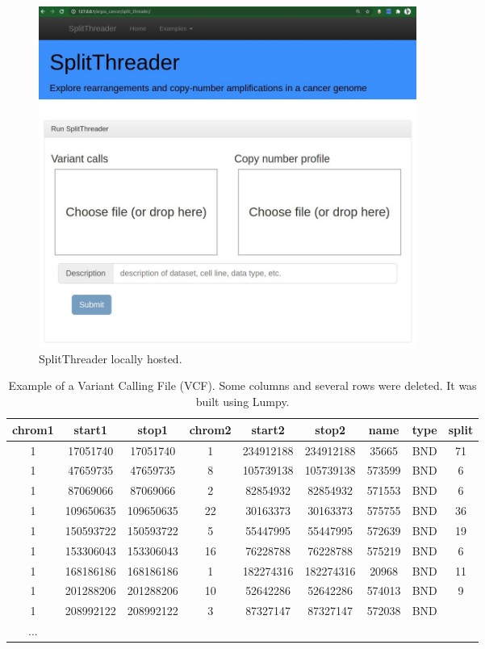 \documentclass{svproc}
\begin{document}
\begin{figure}[h]
	\centering
	\includegraphics[width=0.6\textwidth]{img/splitthreader/split_threader_1}
	\caption{SplitThreader locally hosted. }
	\label{fig:split_threader_1}
\end{figure}

\begin{table}[H]
	\centering
	\caption{Example of a Variant Calling File (VCF). Some columns and several rows were deleted. It was built using Lumpy.}
	\label{tab:vcf}
	\begin{tabular}{ccccccccc}
		\hline
		\textbf{chrom1} & \textbf{start1}    & \textbf{stop1}     & \textbf{chrom2} & \textbf{start2}    & \textbf{stop2}     & \textbf{name} & \textbf{type} & \textbf{split} \\ \hline
		1      & 17051740  & 17051740  & 1      & 234912188 & 234912188 & 35665         & BND           & 71    \\
		1      & 47659735  & 47659735  & 8      & 105739138 & 105739138 & 573599        & BND           & 6     \\
		1      & 87069066  & 87069066  & 2      & 82854932  & 82854932  & 571553        & BND           & 6     \\
		1      & 109650635 & 109650635 & 22     & 30163373  & 30163373  & 575755        & BND           & 36    \\
		1      & 150593722 & 150593722 & 5      & 55447995  & 55447995  & 572639        & BND           & 19    \\
		1      & 153306043 & 153306043 & 16     & 76228788  & 76228788  & 575219        & BND           & 6     \\
		1      & 168186186 & 168186186 & 1      & 182274316 & 182274316 & 20968         & BND           & 11    \\
		1      & 201288206 & 201288206 & 10     & 52642286  & 52642286  & 574013        & BND           & 9     \\
		1      & 208992122 & 208992122 & 3      & 87327147  & 87327147  & 572038        & BND           & \\ 
		... \\ \hline
	\end{tabular}
\end{table}
\end{document}
